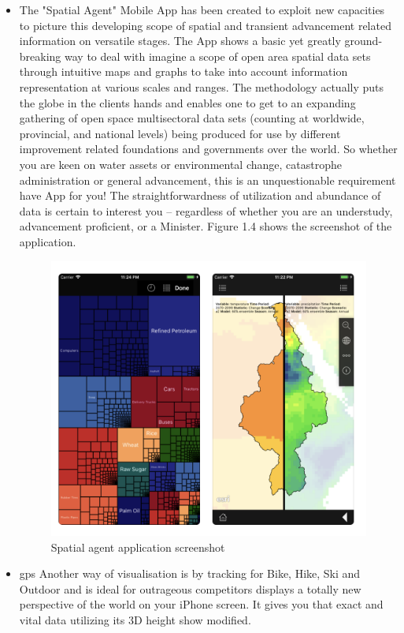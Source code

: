 \begin{itemize}
  
  \item The "Spatial Agent" Mobile App has been created to exploit new capacities to picture this developing scope of spatial and transient advancement related information on versatile stages. The App shows a basic yet greatly ground-breaking way to deal with imagine a scope of open area spatial data sets through intuitive maps and graphs to take into account information representation at various scales and ranges. The methodology actually puts the globe in the clients hands and enables one to get to an expanding gathering of open space multisectoral data sets (counting at worldwide, provincial, and national levels) being produced for use by different improvement related foundations and governments over the world. So whether you are keen on water assets or environmental change, catastrophe administration or general advancement, this is an unquestionable requirement have App for you! The straightforwardness of utilization and abundance of data is certain to interest you – regardless of whether you are an understudy, advancement proficient, or a Minister. Figure 1.4 shows the screenshot of the application. \cite{Spatial_Agent}
  
  
  
  \begin{figure}[H]
            \centering
            \includegraphics[width=0.5\linewidth]{figures/ch1/spatial_agent.png}
            \caption{\label{fig:spatial_agent} Spatial agent application screenshot \cite{Spatial_Agent}}
    \end{figure}
  
  \item \gls{gps} Another way of visualisation is by tracking for Bike, Hike, Ski and Outdoor and is ideal for outrageous competitors displays a totally new perspective of the world on your iPhone screen. It gives you that exact and vital data utilizing its 3D height show modified.
  

\end{itemize}
